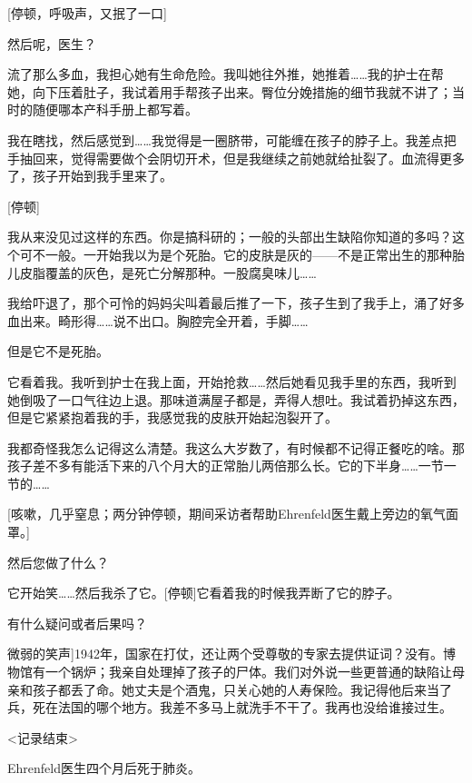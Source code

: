 {[}停顿，呼吸声，又抿了一口]

然后呢，医生？

流了那么多血，我担心她有生命危险。我叫她往外推，她推着……我的护士在帮她，向下压着肚子，我试着用手帮孩子出来。臀位分娩措施的细节我就不讲了；当时的随便哪本产科手册上都写着。

我在瞎找，然后感觉到……我觉得是一圈脐带，可能缠在孩子的脖子上。我差点把手抽回来，觉得需要做个会阴切开术，但是我继续之前她就给扯裂了。血流得更多了，孩子开始到我手里来了。

{[}停顿]

我从来没见过这样的东西。你是搞科研的；一般的头部出生缺陷你知道的多吗？这个可不一般。一开始我以为是个死胎。它的皮肤是灰的——不是正常出生的那种胎儿皮脂覆盖的灰色，是死亡分解那种。一股腐臭味儿……

我给吓退了，那个可怜的妈妈尖叫着最后推了一下，孩子生到了我手上，涌了好多血出来。畸形得……说不出口。胸腔完全开着，手脚……

但是它不是死胎。

它看着我。我听到护士在我上面，开始抢救……然后她看见我手里的东西，我听到她倒吸了一口气往边上退。那味道满屋子都是，弄得人想吐。我试着扔掉这东西，但是它紧紧抱着我的手，我感觉我的皮肤开始起泡裂开了。

我都奇怪我怎么记得这么清楚。我这么大岁数了，有时候都不记得正餐吃的啥。那孩子差不多有能活下来的八个月大的正常胎儿两倍那么长。它的下半身……一节一节的……

{[}咳嗽，几乎窒息；两分钟停顿，期间采访者帮助Ehrenfeld医生戴上旁边的氧气面罩。]

然后您做了什么？

它开始笑……然后我杀了它。{[}停顿]它看着我的时候我弄断了它的脖子。

有什么疑问或者后果吗？

\bb{Ehrenfeld医生：}{[}微弱的笑声]1942年，国家在打仗，还让两个受尊敬的专家去提供证词？没有。博物馆有一个锅炉；我亲自处理掉了孩子的尸体。我们对外说一些更普通的缺陷让母亲和孩子都丢了命。她丈夫是个酒鬼，只关心她的人寿保险。我记得他后来当了兵，死在法国的哪个地方。我差不多马上就洗手不干了。我再也没给谁接过生。

<记录结束>

Ehrenfeld医生四个月后死于肺炎。
